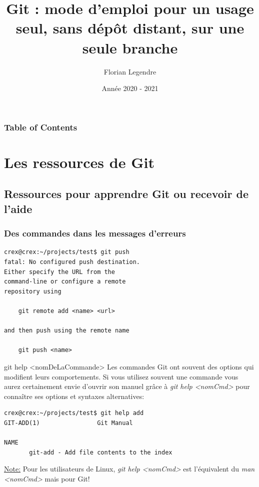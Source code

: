 \documentclass{beamer}
\title[Git seul en local mono-branche]{Git : mode d'emploi pour un usage seul, sans dépôt distant, sur une seule branche}
\author{Florian Legendre}
\institute{Université de Poitiers}
\date{Année 2020 - 2021}
\begin{document}
\frame{\titlepage}

\begin{frame}
\frametitle{Table of Contents}
\tableofcontents[hideallsubsections]
\end{frame}


\section{Les ressources de Git}

\subsection{Ressources pour apprendre Git ou recevoir de l'aide}
\begin{frame}[fragile]
    \frametitle{Des commandes dans les messages d'erreurs}
    \begin{mdframed}[style=Bash]
    \begin{lstlisting}[style=Bash, caption={Exemple de message d'erreur}]
crex@crex:~/projects/test$ git push
fatal: No configured push destination.
Either specify the URL from the 
command-line or configure a remote 
repository using

    git remote add <name> <url>
    
and then push using the remote name

    git push <name>
    \end{lstlisting}
    \end{mdframed}
\end{frame}

\begin{frame}[fragile]{git help <nomDeLaCommande>}
Les commandes Git ont souvent des options qui modifient leurs comportements. Si vous utilisez souvent une commande vous aurez certainement envie d'ouvrir son manuel grâce à \textit{git help <nomCmd>} pour connaître ses options et syntaxes alternatives:
\begin{mdframed}[style=Bash]
    \begin{lstlisting}[style=Bash, caption={Extrait d'un appel de git help sur la commande "add"}]
crex@crex:~/projects/test$ git help add
GIT-ADD(1)                Git Manual                                                                     

NAME
       git-add - Add file contents to the index
    \end{lstlisting}
\end{mdframed}
\underline{Note:} Pour les utilisateurs de Linux, \textit{git help <nomCmd>} est l'équivalent du \textit{man <nomCmd>} mais pour Git!
\end{frame}
\end{document}
